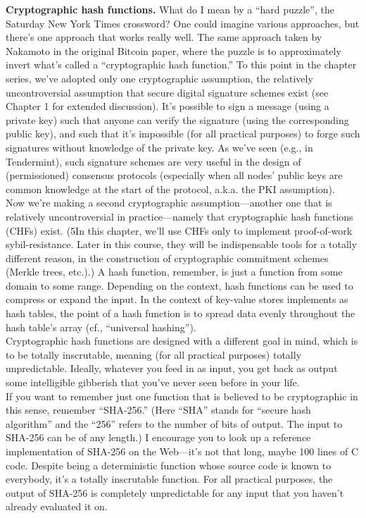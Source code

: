 \noindent
\textbf{Cryptographic hash functions.} What do I mean by a “hard puzzle”, the Saturday
New York Times crossword? One could imagine various approaches, but there’s one approach
that works really well. The same approach taken by Nakamoto in the original Bitcoin
paper, where the puzzle is to approximately invert what’s called a “cryptographic hash
function.”
To this point in the chapter series, we've adopted only one cryptographic assumption, 
the relatively uncontroversial assumption that secure digital signature schemes exist (see Chapter 1 for extended discussion). It’s possible to sign a message (using a private
key) such that anyone can verify the signature (using the corresponding public key), and such
that it’s impossible (for all practical purposes) to forge such signatures without knowledge of
the private key. As we've seen (e.g., in Tendermint), such signature schemes are very useful
in the design of (permissioned) consensus protocols (especially when all nodes’ public keys
are common knowledge at the start of the protocol, a.k.a. the PKI assumption).\\
Now we’re making a second cryptographic assumption—another one that is relatively uncontroversial in practice—namely that cryptographic hash functions (CHFs) exist. (5In this chapter, we’ll use CHFs only to implement proof-of-work sybil-resistance. Later in this course, they will be indispensable tools for a totally different reason, in the construction of cryptographic
commitment schemes (Merkle trees, etc.).) A hash
function, remember, is just a function from some domain to some range. Depending on
the context, hash functions can be used to compress or expand the input. In the context of
key-value stores implements as hash tables, the point of a hash function is to spread data
evenly throughout the hash table’s array (cf., “universal hashing”).\\
Cryptographic hash functions are designed with a different goal in mind, which is to
be totally inscrutable, meaning (for all practical purposes) totally unpredictable. Ideally,
whatever you feed in as input, you get back as output some intelligible gibberish that you’ve
never seen before in your life.\\
If you want to remember just one function that is believed to be cryptographic in this
sense, remember “SHA-256.” (Here “SHA” stands for “secure hash algorithm” and the
“256” refers to the number of bits of output. The input to SHA-256 can be of any length.)
I encourage you to look up a reference implementation of SHA-256 on the Web—it’s not
that long, maybe 100 lines of C code. Despite being a deterministic function whose source
code is known to everybody, it’s a totally inscrutable function. For all practical purposes,
the output of SHA-256 is completely unpredictable for any input that you haven’t already
evaluated it on.\\

